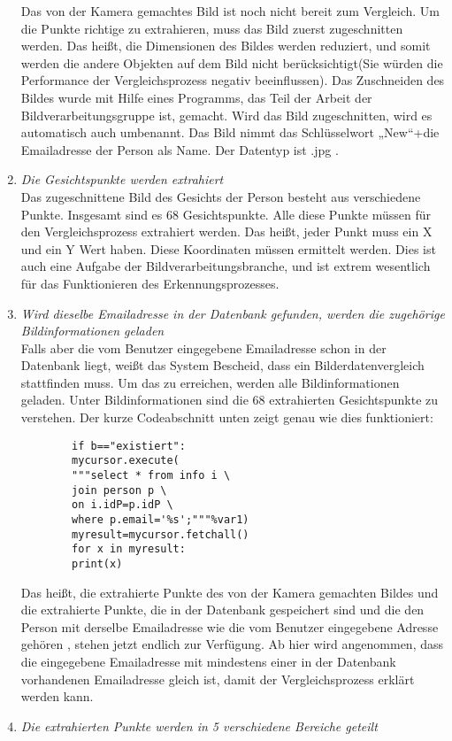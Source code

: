 \begin{enumerate}
Das von der Kamera gemachtes Bild ist noch nicht bereit zum Vergleich. Um die Punkte richtige zu extrahieren, muss das Bild zuerst zugeschnitten werden. Das heißt, die Dimensionen des Bildes werden reduziert, und somit werden die andere Objekten auf dem Bild nicht berücksichtigt(Sie würden die Performance der Vergleichsprozess negativ beeinflussen). Das Zuschneiden des Bildes wurde mit Hilfe eines Programms, das Teil der Arbeit der Bildverarbeitungsgruppe ist, gemacht. Wird das Bild zugeschnitten, wird es automatisch auch umbenannt. Das Bild nimmt das Schlüsselwort „New“+die Emailadresse der Person als Name. Der Datentyp ist .jpg .
	\item \textit{Die Gesichtspunkte werden extrahiert} \\
	
Das zugeschnittene Bild des Gesichts der Person besteht aus verschiedene Punkte. Insgesamt sind es 68 Gesichtspunkte. Alle diese Punkte müssen für den Vergleichsprozess extrahiert werden. Das heißt, jeder Punkt muss ein X und ein Y Wert haben. Diese Koordinaten müssen ermittelt werden. Dies ist auch eine Aufgabe der Bildverarbeitungsbranche, und ist extrem wesentlich für das Funktionieren des Erkennungsprozesses.
	\item \textit{Wird dieselbe Emailadresse in der Datenbank gefunden, werden die zugehörige Bildinformationen geladen} \\
	
	Falls aber die vom Benutzer eingegebene Emailadresse schon in der Datenbank liegt, weißt das System Bescheid, dass ein Bilderdatenvergleich stattfinden muss. Um das zu erreichen, werden alle Bildinformationen geladen. Unter Bildinformationen sind die 68 extrahierten Gesichtspunkte zu verstehen. Der kurze Codeabschnitt unten zeigt genau wie dies funktioniert: \\
	
	\begin{lstlisting}
		if b=="existiert":
		mycursor.execute(
		"""select * from info i \
		join person p \
		on i.idP=p.idP \
		where p.email='%s';"""%var1)
		myresult=mycursor.fetchall()
		for x in myresult:
		print(x)
	\end{lstlisting}
	
	Das heißt, die extrahierte Punkte des von der Kamera gemachten Bildes und die extrahierte Punkte, die in der Datenbank gespeichert sind und die den Person mit derselbe Emailadresse wie die vom Benutzer eingegebene Adresse gehören , stehen jetzt endlich zur Verfügung. Ab hier wird angenommen, dass die eingegebene Emailadresse mit mindestens einer in der Datenbank vorhandenen Emailadresse gleich ist, damit der Vergleichsprozess erklärt werden kann.
	\item \textit{Die extrahierten Punkte werden in 5 verschiedene Bereiche geteilt} \\
	

\end{enumerate}
